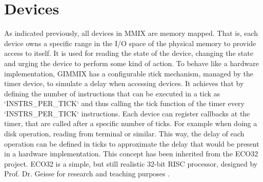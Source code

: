 \section{Devices}

As indicated previously, all devices in MMIX are memory mapped. That is, each device owns a specific range in the I/O space of the physical memory to provide access to itself. It is used for reading the state of the device, changing the state and urging the device to perform some kind of action. To behave like a hardware implementation, GIMMIX has a configurable \i{tick mechanism}, managed by the timer device, to simulate a delay when accessing devices. It achieves that by defining the number of instructions that can be executed in a tick as `INSTRS_PER_TICK` and thus calling the tick function of the timer every `INSTRS_PER_TICK` instructions. Each device can register callbacks at the timer, that are called after a specific number of ticks. For example when doing a disk operation, reading from terminal or similar. This way, the delay of each operation can be defined in ticks to approximate the delay that would be present in a hardware implementation. This concept has been inherited from the ECO32 project. ECO32 is a simple, but still realistic 32-bit  \gls{RISC} processor, designed by Prof. Dr. Geisse for research and teaching purposes \citep{eco32}.

